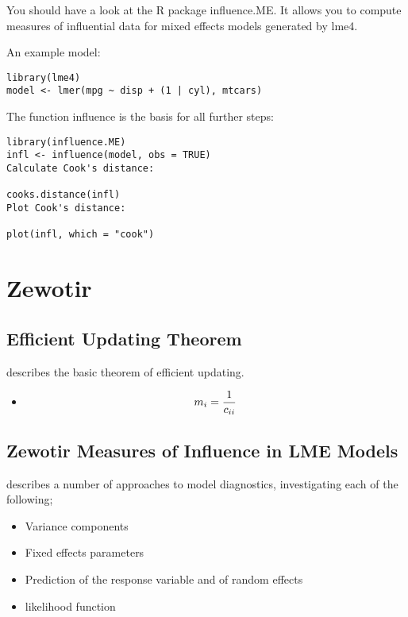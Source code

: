 \documentclass[12pt, a4paper]{article}
\begin{document}
You should have a look at the R package influence.ME. It allows you to compute measures of influential data for mixed effects models generated by lme4.

An example model:

\begin{verbatim}
library(lme4)
model <- lmer(mpg ~ disp + (1 | cyl), mtcars)
\end{verbatim}

The function influence is the basis for all further steps:

\begin{verbatim}
library(influence.ME)
infl <- influence(model, obs = TRUE)
Calculate Cook's distance:

cooks.distance(infl)
Plot Cook's distance:

plot(infl, which = "cook")
\end{verbatim}


\chapter{Zewotir}


\section{Efficient Updating Theorem} %
\citet{Zewotir} describes the basic theorem of efficient updating.
\begin{itemize}
	\item \[ m_i = {1 \over c_{ii}}\]
\end{itemize}
\section{Zewotir Measures of Influence in LME Models}%
\citet{Zewotir} describes a number of approaches to model diagnostics, investigating each of the following;
\begin{itemize}
	\item Variance components
	\item Fixed effects parameters
	\item Prediction of the response variable and of random effects
	\item likelihood function
\end{itemize}
\newpage
\end{document}
